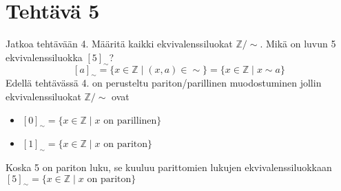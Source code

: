 \documentclass{article}
\begin{document}
        \newpage
        \section*{Tehtävä 5}
        Jatkoa tehtävään 4. Määritä kaikki ekvivalenssiluokat $\mathbb{Z}/\sim$. Mikä on luvun 5 ekvivalenssiluokka $[5]_\sim$?
        \[
            [a]_\sim = \{ x\in \mathbb{Z} \mid (x, a) \in \sim\} = \{x \in \mathbb{Z} \mid x\sim a \}
        \]
        Edellä tehtävässä 4. on perusteltu pariton/parillinen muodostuminen jollin ekvivalenssiluokat $\mathbb{Z}/\sim$ ovat
        \begin{itemize}
        \item
                $[0]_\sim = \{ x \in \mathbb{Z} \mid x \text{ on parillinen} \}$
        \item
                $[1]_\sim = \{ x \in \mathbb{Z} \mid x \text{ on pariton} \}$
        \end{itemize}
        Koska  5  on pariton luku, se kuuluu parittomien lukujen ekvivalenssiluokkaan\newline
        $[5]_\sim = \{ x \in \mathbb{Z} \mid x \text{ on pariton} \}$
\end{document}
